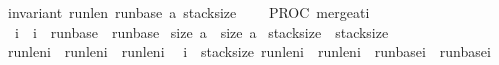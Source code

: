 \begin{isabellebody}
{\isacharparenleft}invariant\ {\isasymacute}run{\isacharunderscore}len\ {\isasymacute}run{\isacharunderscore}base\ {\isasymacute}a\ {\isasymacute}stack{\isacharunderscore}size{\isacharparenright}\ {\isasymrbrace}\ \isanewline
\ \ PROC\ merge{\isacharunderscore}at{\isacharparenleft}{\isasymacute}i{\isacharparenright}\ \isanewline
{\isasymlbrace}\ {\isacharparenleft}{\isasymacute}i\ {\isacharequal}\ \isactrlbsup {\isasymsigma}\isactrlesup i{\isacharparenright}\ {\isasymand}\ {\isacharparenleft}{\isasymacute}run{\isacharunderscore}base{\isacharbang}{}\ {\isacharequal}\ \isactrlbsup {\isasymsigma}\isactrlesup run{\isacharunderscore}base{\isacharbang}{}{\isacharparenright}\ {\isasymand}\isanewline
{\isacharparenleft}size\ {\isasymacute}a\ {\isacharequal}\ size\ \isactrlbsup {\isasymsigma}\isactrlesup a{\isacharparenright}\ {\isasymand}\isanewline
{\isacharparenleft}{\isasymacute}stack{\isacharunderscore}size\ {\isacharequal}\ \isactrlbsup {\isasymsigma}\isactrlesup stack{\isacharunderscore}size\ {\isacharminus}\ {}{\isacharparenright}\ {\isasymand}\isanewline
{\isacharparenleft}{\isasymacute}run{\isacharunderscore}len{\isacharbang}{\isasymacute}i\ {\isacharequal}\ {\isacharparenleft}\isactrlbsup {\isasymsigma}\isactrlesup run{\isacharunderscore}len{\isacharparenright}{\isacharbang}{\isacharparenleft}{\isasymacute}i{\isacharparenright}\ {\isacharplus}\ {\isacharparenleft}\isactrlbsup {\isasymsigma}\isactrlesup run{\isacharunderscore}len{\isacharbang}{\isacharparenleft}{\isasymacute}i{\isacharplus}{}{\isacharparenright}{\isacharparenright}{\isacharparenright}\ {\isasymand}\ \isanewline
{\isacharparenleft}{\isacharparenleft}{\isasymacute}i\ {\isacharequal}\ \isactrlbsup {\isasymsigma}\isactrlesup stack{\isacharunderscore}size\ {\isacharminus}{}{\isacharparenright}{\isasymlongrightarrow}{\isacharparenleft}{\isasymacute}run{\isacharunderscore}len{\isacharbang}{\isacharparenleft}{\isasymacute}i{\isacharplus}{}{\isacharparenright}\ {\isacharequal}\ \isactrlbsup {\isasymsigma}\isactrlesup run{\isacharunderscore}len{\isacharbang}{\isacharparenleft}{\isasymacute}i{\isacharplus}{}{\isacharparenright}{\isacharparenright}\ {\isasymand}\ {\isacharparenleft}{\isasymacute}run{\isacharunderscore}base{\isacharbang}{\isacharparenleft}{\isasymacute}i{\isacharplus}{}{\isacharparenright}\ {\isacharequal}\ \isactrlbsup {\isasymsigma}\isactrlesup run{\isacharunderscore}base{\isacharbang}{\isacharparenleft}{\isasymacute}i{\isacharplus}{}{\isacharparenright}{\isacharparenright}{\isacharparenright}\ {\isasymand}\isanewline

\end{isabellebody}
